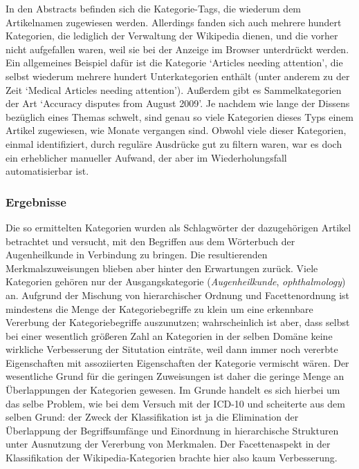 \documentclass[pagesize,DIV=calc,12pt,draft]{scrreprt}
\begin{document}
\begin{inparaenum}
\item In den Abstracts befinden sich die Kategorie-Tags, die wiederum dem Artikelnamen zugewiesen werden. 
Allerdings fanden sich auch mehrere hundert Kategorien, die lediglich der Verwaltung der Wikipedia dienen, und die vorher nicht aufgefallen waren, weil sie bei der Anzeige im Browser unterdrückt werden. 
Ein allgemeines Beispiel dafür ist die Kategorie `Articles needing attention', die selbst wiederum mehrere hundert Unterkategorien enthält (unter anderem zu der Zeit `Medical Articles needing attention'). 
Außerdem gibt es Sammelkategorien der Art `Accuracy disputes from August 2009'. 
Je nachdem wie lange der Dissens bezüglich eines Themas schwelt, sind genau so viele Kategorien dieses Typs einem Artikel zugewiesen, wie Monate vergangen sind. 
Obwohl viele dieser Kategorien, einmal identifiziert, durch reguläre Ausdrücke gut zu filtern waren, war es doch ein erheblicher manueller Aufwand, der aber im Wiederholungsfall automatisierbar ist. \end{inparaenum}

\subsubsection{Ergebnisse}

Die so ermittelten Kategorien wurden als Schlagwörter der dazugehörigen Artikel betrachtet und versucht, mit den Begriffen aus dem Wörterbuch der Augenheilkunde in Verbindung zu bringen. 
Die resultierenden Merkmalszuweisungen blieben aber hinter den Erwartungen zurück. 
Viele Kategorien gehören nur der Ausgangskategorie (\emph{Augenheilkunde}, \emph{ophthalmology}) an. 
Aufgrund der Mischung von hierarchischer Ordnung und Facettenordnung ist mindestens die Menge der Kategoriebegriffe zu klein um eine erkennbare Vererbung der Kategoriebegriffe auszunutzen; wahrscheinlich ist aber, dass selbst bei einer wesentlich größeren Zahl an Kategorien in der selben Domäne keine wirkliche Verbesserung der Situtation einträte, weil dann immer noch vererbte Eigenschaften mit assoziierten Eigenschaften der Kategorie vermischt wären. 
Der wesentliche Grund für die geringen Zuweisungen ist daher die geringe Menge an Überlappungen der Kategorien gewesen. 
Im Grunde handelt es sich hierbei um das selbe Problem, wie bei dem Versuch mit der ICD-10 und scheiterte aus dem selben Grund: der Zweck der Klassifikation ist ja die Elimination der Überlappung der Begriffsumfänge und Einordnung in hierarchische Strukturen unter Ausnutzung der Vererbung von Merkmalen. 
Der Facettenaspekt in der Klassifikation der Wikipedia-Kategorien brachte hier also kaum Verbesserung. 
\end{document}
